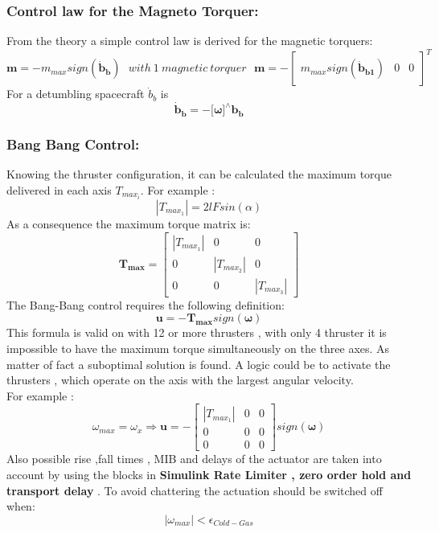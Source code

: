 \documentclass[11pt]{article}
\begin{document}
 \subsubsection{Control law for the Magneto Torquer:}\label{wwwww}
 From the theory a simple control law is derived for the magnetic torquers:
 \begin{equation}
 \mathbf{m}=-m_{max}sign(\mathbf{\dot{b}_b}) \ \ \ with \ 1\  magnetic \ torquer \ \ \ \mathbf{m}=-\begin{bmatrix}
 m_{max}sign(\mathbf{\dot{b}_{b1}})&0 &0
 \end{bmatrix}^T
 \end{equation}
 For a detumbling spacecraft $\dot{b}_b$ is
 \begin{equation}
 \mathbf{\dot{b}_b}=-[\boldsymbol{\omega]^\wedge}\mathbf{b_b}
 \end{equation}
 
  \subsubsection{Bang Bang Control:}
 Knowing the thruster configuration, it can be calculated the maximum torque delivered in each axis $T_{max_i}$. For example :
 \begin{equation}
     |{T_{max_1}}|=2lFsin(\alpha)
 \end{equation}
 As a consequence the maximum torque matrix is:
 \begin{equation}
   \mathbf{T_{max}} = \begin{bmatrix}
      |{T_{max_1}}|& 0 &0\\
      0&  |{T_{max_2}}| &0 \\
      0& 0 &  |{T_{max_3}}|
     \end{bmatrix}
 \end{equation}
 The Bang-Bang control requires the following definition:
 \begin{equation}
     \mathbf{u}=-\mathbf{T_{max}}sign(\boldsymbol{\omega})
 \end{equation}
 This formula is valid on with 12 or more thrusters , with only 4 thruster it is impossible to have the maximum torque simultaneously on the three axes. As matter of fact a suboptimal solution is found. A logic could be to activate the thrusters , which operate on the axis with the largest angular velocity.\\ For example :
 \begin{equation}
     \omega_{max}=\omega_x \Longrightarrow  \mathbf{u}=-\begin{bmatrix}
      |{T_{max_1}}|& 0 &0\\
      0&  0&0 \\
      0 & 0 & 0
     \end{bmatrix}
     sign(\mathbf{\boldsymbol{\omega}})
 \end{equation}
 Also possible rise ,fall times , MIB and delays of the actuator are taken into account by using the blocks in \textbf {Simulink Rate Limiter , zero order hold and transport delay} .
 To avoid chattering the actuation should be switched off when:
 \begin{equation}
     |\omega_{max}|< \epsilon_{Cold-Gas}
 \end{equation}
\end{document}
